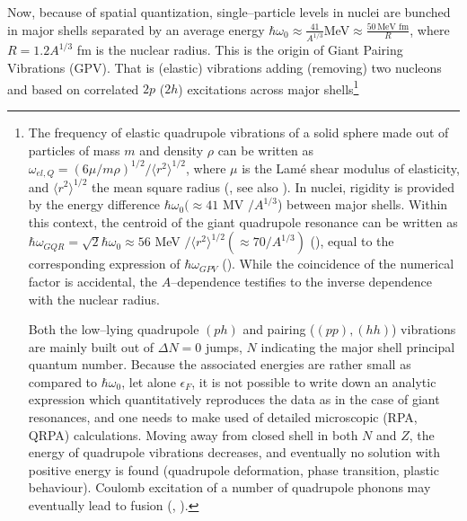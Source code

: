 \documentclass[a4paper,11pt]{article}
\numberwithin{equation}{section}
\numberwithin{figure}{section}
\numberwithin{table}{section}
\newcommand{\braket}[1]{\langle {#1} \rangle }
\begin{document}
Now, because of spatial quantization, single--particle levels in nuclei are bunched in major shells separated by an average energy $\hbar \omega_0\approx\frac{41}{A^{1/3}}$MeV$\approx \frac{50\,\text{MeV fm}}{R}$, where $R=1.2 A^{1/3}$ fm is the nuclear radius. This is the origin of Giant Pairing Vibrations (GPV). That is (elastic) vibrations adding (removing) two nucleons and based on correlated $2p$ ($2h$) excitations across major shells\footnote{The frequency of elastic quadrupole vibrations of a solid sphere made out of particles of mass $m$ and density $\rho$ can be written as $\omega_{el,Q}=(6\mu/m\rho)^{1/2}/\braket{r^2}^{1/2}$, where $\mu$ is the Lam\'e shear modulus of elasticity, and $\braket{r^2}^{1/2}$ the mean square radius (\cite{Bertsch:05}, see also \cite{Bertsch:83b}). In nuclei, rigidity is provided by the energy difference $\hbar\omega_0(\approx 41$ MV $/A^{1/3}$) between major shells. Within this context, the centroid of the giant quadrupole resonance can be written as $\hbar\omega_{GQR}=\sqrt{2}\hbar\omega_0\approx 56 $ MeV $/\braket{r^2}^{1/2} (\approx 70/A^{1/3})$ (\cite{Bortignon:98}), equal to the corresponding expression of $\hbar\omega_{GPV}$ (\cite{Broglia:77}). While the coincidence of the numerical factor is accidental, the $A$--dependence testifies to the inverse dependence with the nuclear radius.
	
	Both the low--lying quadrupole $(ph)$ and pairing ($(pp),(hh)$) vibrations are mainly built out of $\Delta N=0$ jumps, $N$ indicating the major shell principal quantum number. Because the associated energies are rather small as compared to $\hbar\omega_0$, let alone $\epsilon_F$, it is not possible to write down an analytic expression which quantitatively reproduces the data as in the case of giant resonances, and one needs to make used of detailed microscopic (RPA, QRPA) calculations. Moving away from closed shell in both $N$ and $Z$, the energy of quadrupole vibrations  decreases, and eventually no solution with positive energy is found (quadrupole deformation, phase transition, plastic behaviour). Coulomb excitation of a number of quadrupole phonons may eventually lead to fusion (\cite{Beyer:69}, \cite{Kruse:80}).
	
}
\end{document}
